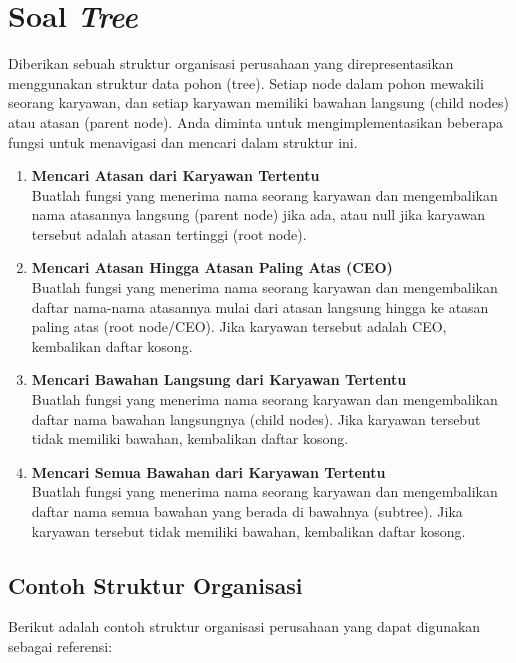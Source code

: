 \section{Soal \textit{Tree}}

Diberikan sebuah struktur organisasi perusahaan yang direpresentasikan menggunakan struktur data pohon (tree). Setiap node dalam pohon mewakili seorang karyawan, dan setiap karyawan memiliki bawahan langsung (child nodes) atau atasan (parent node). Anda diminta untuk mengimplementasikan beberapa fungsi untuk menavigasi dan mencari dalam struktur ini.


\begin{enumerate}
	\item \textbf{Mencari Atasan dari Karyawan Tertentu} \\
	Buatlah fungsi yang menerima nama seorang karyawan dan mengembalikan nama atasannya langsung (parent node) jika ada, atau null jika karyawan tersebut adalah atasan tertinggi (root node).
	
	\item \textbf{Mencari Atasan Hingga Atasan Paling Atas (CEO)} \\
	Buatlah fungsi yang menerima nama seorang karyawan dan mengembalikan daftar nama-nama atasannya mulai dari atasan langsung hingga ke atasan paling atas (root node/CEO). Jika karyawan tersebut adalah CEO, kembalikan daftar kosong.
	
	\item \textbf{Mencari Bawahan Langsung dari Karyawan Tertentu} \\
	Buatlah fungsi yang menerima nama seorang karyawan dan mengembalikan daftar nama bawahan langsungnya (child nodes). Jika karyawan tersebut tidak memiliki bawahan, kembalikan daftar kosong.
	
	\item \textbf{Mencari Semua Bawahan dari Karyawan Tertentu} \\
	Buatlah fungsi yang menerima nama seorang karyawan dan mengembalikan daftar nama semua bawahan yang berada di bawahnya (subtree). Jika karyawan tersebut tidak memiliki bawahan, kembalikan daftar kosong.
\end{enumerate}

\subsection{Contoh Struktur Organisasi}

Berikut adalah contoh struktur organisasi perusahaan yang dapat digunakan sebagai referensi:



